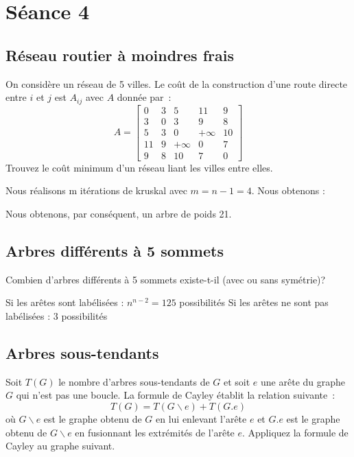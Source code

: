 \section{Séance 4}

\subsection{Réseau routier à moindres frais}
On considère un réseau de 5 villes. Le coût de la construction d'une route directe entre $i$ et $j$ est $A_{ij}$ avec $A$ donnée par~:
\[
  A = \begin{bmatrix}
    0 & 3 & 5 & 11 & 9 \\
    3 & 0 & 3 & 9 & 8 \\
    5 & 3 & 0 & +\infty & 10 \\
    11 & 9 & +\infty & 0 & 7 \\
    9 & 8 & 10 & 7 & 0
  \end{bmatrix}
\]
Trouvez le coût minimum d'un réseau liant les villes entre elles.
\begin{solution}
Nous réalisons m itérations de kruskal avec $m=n-1=4$. Nous obtenons :
\begin{center}
  \end{center}
	Nous obtenons, par conséquent, un arbre de poids 21.
	\end{solution}
\subsection{Arbres différents à 5 sommets}
Combien d'arbres différents à 5 sommets existe-t-il (avec ou sans symétrie)?
\begin{solution}
Si les arêtes sont labélisées : $n^{n-2}=125$ possibilités
Si les arêtes ne sont pas labélisées : $3$ possibilités 
\end{solution}
\subsection{Arbres sous-tendants}
Soit $T(G)$ le nombre d'arbres sous-tendants de $G$ et soit $e$ une arête du graphe $G$ qui n'est pas une boucle. La formule de Cayley établit la relation suivante~:
\[
  T(G) = T(G \backslash e) + T(G.e)
\]
où $G \backslash e$ est le graphe obtenu de $G$ en lui enlevant l'arête $e$ et $G.e$ est le graphe obtenu de $G \backslash e$ en fusionnant les extrémités de l'arête $e$. Appliquez la formule de Cayley au graphe suivant.

